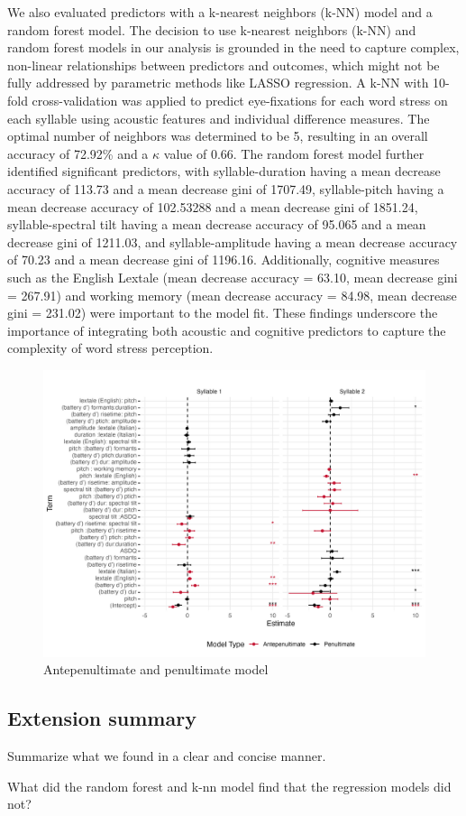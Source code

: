 We also evaluated predictors with a k-nearest neighbors (k-NN) model and a random forest model. The decision to use k-nearest neighbors (k-NN) and random forest models in our analysis is grounded in the need to capture complex, non-linear relationships between predictors and outcomes, which might not be fully addressed by parametric methods like LASSO regression. A k-NN with 10-fold cross-validation was applied to predict eye-fixations for each word stress on each syllable using acoustic features and individual difference measures. The optimal number of neighbors was determined to be 5, resulting in an overall accuracy of 72.92\% and a $\kappa$ value of 0.66. The random forest model further identified significant predictors, with syllable-duration having a mean decrease accuracy of 113.73 and a mean decrease gini of 1707.49, syllable-pitch having a mean decrease accuracy of 102.53288 and a mean decrease gini of 1851.24, syllable-spectral tilt having a mean decrease accuracy of 95.065 and a mean decrease gini of 1211.03, and syllable-amplitude having a mean decrease accuracy of 70.23 and a mean decrease gini of 1196.16. Additionally, cognitive measures such as the English Lextale (mean decrease accuracy = 63.10, mean decrease gini = 267.91) and working memory (mean decrease accuracy = 84.98, mean decrease gini = 231.02) were important to the model fit. These findings underscore the importance of integrating both acoustic and cognitive predictors to capture the complexity of word stress perception.

\begin{figure}[H]
  \centering
  \includegraphics[width=1\linewidth]{visuals/extended_analysis.jpeg} %
  \caption{Antepenultimate and penultimate model}
  \label{fig:extened_analysis}
\end{figure}


\subsection{Extension summary}
Summarize what we found in a clear and concise manner.

What did the random forest and k-nn model find that the regression models did not? 
